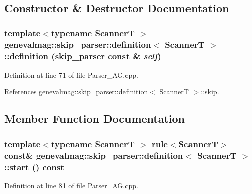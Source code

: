 \subsection{Constructor \& Destructor Documentation}
\hypertarget{structgenevalmag_1_1skip__parser_1_1definition_a07635eafec4514b1414d278690927029}{
\subsubsection[{definition}]{\setlength{\rightskip}{0pt plus 5cm}template$<$typename ScannerT $>$ {\bf genevalmag::skip\_\-parser::definition}$<$ ScannerT $>$::{\bf definition} ({\bf skip\_\-parser} const \& {\em self})}}
\label{structgenevalmag_1_1skip__parser_1_1definition_a07635eafec4514b1414d278690927029}


Definition at line 71 of file Parser\_\-AG.cpp.



References genevalmag::skip\_\-parser::definition$<$ ScannerT $>$::skip.



\subsection{Member Function Documentation}
\hypertarget{structgenevalmag_1_1skip__parser_1_1definition_aa0b33d5c074089c9c6b2b32f7b231ec8}{
\subsubsection[{start}]{\setlength{\rightskip}{0pt plus 5cm}template$<$typename ScannerT $>$ rule$<$ScannerT$>$ const\& {\bf genevalmag::skip\_\-parser::definition}$<$ ScannerT $>$::start () const}}
\label{structgenevalmag_1_1skip__parser_1_1definition_aa0b33d5c074089c9c6b2b32f7b231ec8}


Definition at line 81 of file Parser\_\-AG.cpp.



